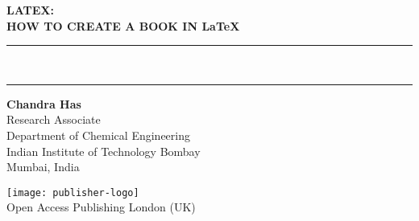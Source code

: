 
{}
{
\centering
\Huge\bfseries LATEX:\\
 HOW TO CREATE A BOOK IN \LaTeX\\[-4mm]
\color{red}  
 \rule{\linewidth}{1pt}\\[-6mm]
 \rule{\linewidth}{2pt}
}


\vskip3cm
{\noindent \LARGE \bfseries  Chandra Has}\\[5mm]

\noindent Research Associate\\
Department of Chemical Engineering\\
Indian Institute of Technology Bombay\\
Mumbai, India

\vfill 
\texttt{[image: publisher-logo]}\\[1mm]
Open Access Publishing London (UK)

\clearpage